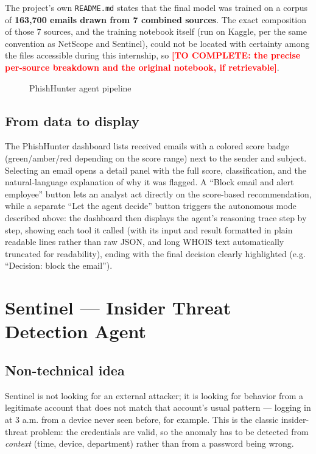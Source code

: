 \documentclass[12pt,a4paper]{report}
\newcommand{\TODO}[1]{\textcolor{red}{\textbf{[TO COMPLETE: #1]}}}
\begin{document}
The project's own \texttt{README.md} states that the final model was trained on a corpus of \textbf{163,700 emails drawn from 7 combined sources}. The exact composition of those 7 sources, and the training notebook itself (run on Kaggle, per the same convention as NetScope and Sentinel), could not be located with certainty among the files accessible during this internship, so \TODO{the precise per-source breakdown and the original notebook, if retrievable}.

\begin{figure}[htbp]
\centering

\caption{PhishHunter agent pipeline}
\label{fig:phishhunter-pipeline}
\end{figure}

\subsection*{From data to display}
\begin{flushleft}
The PhishHunter dashboard lists received emails with a colored score badge (green/amber/red depending on the score range) next to the sender and subject. Selecting an email opens a detail panel with the full score, classification, and the natural-language explanation of why it was flagged. A ``Block email and alert employee'' button lets an analyst act directly on the score-based recommendation, while a separate ``Let the agent decide'' button triggers the autonomous mode described above: the dashboard then displays the agent's reasoning trace step by step, showing each tool it called (with its input and result formatted in plain readable lines rather than raw JSON, and long WHOIS text automatically truncated for readability), ending with the final decision clearly highlighted (e.g. ``Decision: block the email'').
\end{flushleft}

\section{Sentinel --- Insider Threat Detection Agent}

\subsection*{Non-technical idea}
Sentinel is not looking for an external attacker; it is looking for behavior from a legitimate account that does not match that account's usual pattern --- logging in at 3 a.m. from a device never seen before, for example. This is the classic insider-threat problem: the credentials are valid, so the anomaly has to be detected from \emph{context} (time, device, department) rather than from a password being wrong.
\end{document}

